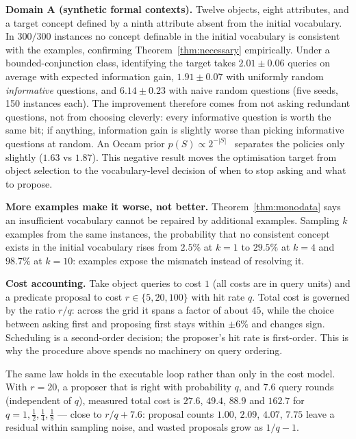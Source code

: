 \documentclass[11pt]{article}
\begin{document}
\textbf{Domain A (synthetic formal contexts).} Twelve objects, eight attributes, and a target
concept defined by a ninth attribute absent from the initial vocabulary. In $300/300$ instances
no concept definable in the initial vocabulary is consistent with the examples, confirming
Theorem~\ref{thm:necessary} empirically. Under a bounded-conjunction class, identifying the target
takes $2.01 \pm 0.06$ queries on average with expected information gain, $1.91 \pm 0.07$ with
uniformly random \emph{informative} questions, and $6.14 \pm 0.23$ with naive random questions
(five seeds, 150 instances each). The improvement therefore comes from
not asking redundant questions, not from choosing cleverly: every informative question is worth
the same bit; if anything, information gain is slightly worse than picking informative questions
at random.
An Occam prior $p(S)\propto 2^{-|S|}$~\cite{grunwald2019} separates the policies only slightly
($1.63$ vs $1.87$). This negative result moves the optimisation target from object selection to the
vocabulary-level decision of when to stop asking and what to propose.

\textbf{More examples make it worse, not better.} Theorem~\ref{thm:monodata} says an insufficient
vocabulary cannot be repaired by additional examples. Sampling $k$ examples from the same
instances, the probability that no consistent concept exists in the initial vocabulary rises from
$2.5\%$ at $k=1$ to $29.5\%$ at $k=4$ and $98.7\%$ at $k=10$: examples expose the mismatch instead
of resolving it.

\textbf{Cost accounting.} Take object queries to cost $1$ (all costs are in query units) and a predicate proposal to cost
$r \in \{5, 20, 100\}$ with hit rate $q$. Total cost is governed by the ratio $r/q$: across the
grid it spans a factor of about $45$, while the choice between asking first and proposing first stays
within $\pm 6\%$ and changes sign. Scheduling is a second-order decision; the proposer's hit rate
is first-order. This is why the procedure above spends no machinery on query ordering.

The same law holds in the executable loop rather than only in the cost model. With $r = 20$, a
proposer that is right with probability $q$, and $7.6$ query rounds (independent of $q$), measured
total cost is $27.6$, $49.4$, $88.9$ and $162.7$ for $q = 1, \tfrac12, \tfrac14, \tfrac18$ ---
close to $r/q + 7.6$: proposal counts $1.00$, $2.09$, $4.07$, $7.75$ leave a residual within sampling
noise, and wasted proposals grow as $1/q-1$.
\end{document}
